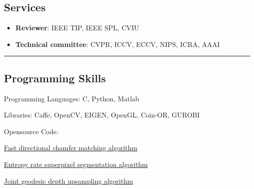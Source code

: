 \documentclass[10pt,letterpaper]{article}
\newenvironment{indentsection}[1]%
{\begin{list}{}%
	{\setlength{\leftmargin}{#1}}%
	\item[]%
}
{\end{list}}
\newcommand{\CPP}
{C\nolinebreak[4]\hspace{-.05em}\raisebox{.22ex}{\footnotesize\bf ++}}
\begin{document}
\subsection*{Services}
\begin{itemize}
\item {\bf Reviewer}: IEEE TIP, IEEE SPL, CVIU\vspace{-2mm}
\item {\bf Technical committee}: CVPR, ICCV, ECCV, NIPS, ICRA, AAAI\vspace{-2mm}
\end{itemize}
\hrule
\vspace{-0.4em}
\subsection*{Programming Skills}
\begin{indentsection}{\parindent}
\begin{description*}
	\item[Programming Languages:]
	\CPP, Python, Matlab
	\item[Libraries:]
    Caffe, OpenCV, EIGEN, OpenGL, Coin-OR, GUROBI
	\item[Opensource Code:] $\quad$
	\begin{itemize*}
    \item \href{https://github.com/mingyuliutw/fdcm.git}{Fast directional chamfer matching algorithm}
    \item \href{https://github.com/mingyuliutw/ers.git}{Entropy rate superpixel segmentation algorithm}
    \item \href{http://www.merl.com/research/license/}{Joint geodesic depth upsampling algorithm}
  \end{itemize*}
\end{description*}
\end{indentsection}
\end{document}
